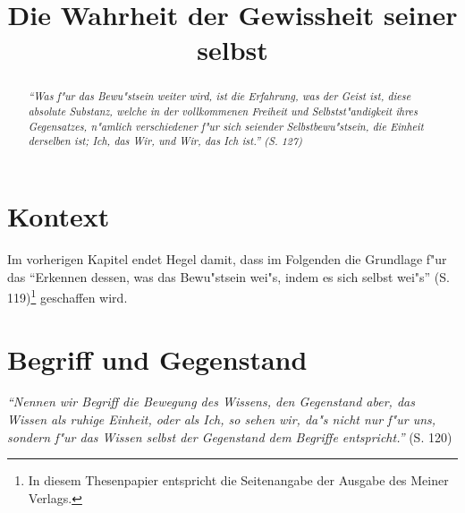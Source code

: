\documentclass[a4paper, justified]{tufte-handout}
\title{Die Wahrheit der Gewissheit seiner selbst}%
\date{ } %
\begin{document}
\maketitle%

\begin{abstract}
\noindent
\emph{"`Was f"ur das Bewu"stsein weiter wird, ist die Erfahrung, was der Geist ist, diese absolute Substanz, welche in der vollkommenen Freiheit und Selbstst"andigkeit ihres Gegensatzes, n"amlich verschiedener f"ur sich seiender Selbstbewu"stsein, die Einheit derselben ist; Ich, das Wir, und Wir, das Ich ist."' (S. 127)}

\end{abstract}


\section{Kontext}\label{sec:context}

Im vorherigen Kapitel endet Hegel damit, dass im Folgenden die Grundlage f"ur das "`Erkennen dessen, was das Bewu"stsein wei"s, indem es sich selbst wei"s"' (S. 119)\footnote{In diesem Thesenpapier entspricht die Seitenangabe der Ausgabe des Meiner Verlags.} geschaffen wird.

\section{Begriff und Gegenstand}\label{sec:context}

\emph{"`Nennen wir Begriff die Bewegung des Wissens, den Gegenstand aber, das Wissen als ruhige Einheit, oder als Ich, so sehen wir, da"s nicht nur f"ur uns, sondern f"ur das Wissen selbst der Gegenstand dem Begriffe entspricht."'} (S. 120)

\end{document}
